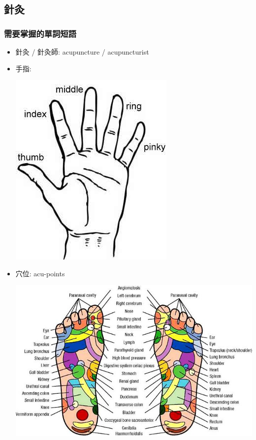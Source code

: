 \subsection{針灸}
\subsubsection*{需要掌握的單詞短語}
\begin{itemize}
  \itemsep0em
  \item 針灸 / 針灸師: acupuncture / acupuncturist
  \item 手指:
  \begin{center}
    \includegraphics[scale=.55]{pics/fingers}
  \end{center}
  \item 穴位: acu-points
  \begin{center}
    \includegraphics[scale=.75]{pics/acu-points}

\end{center}
\end{itemize}
